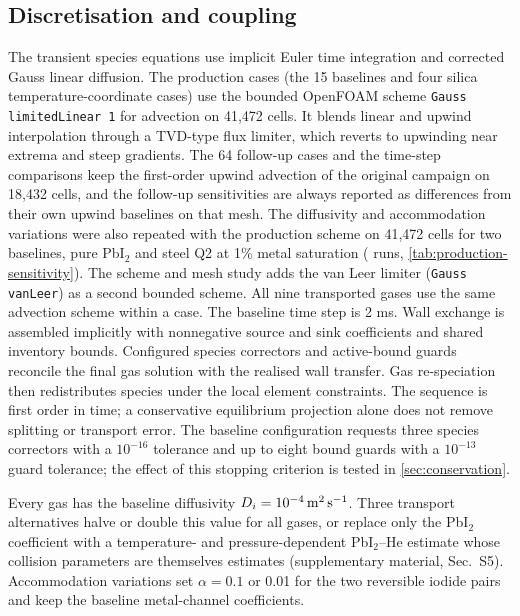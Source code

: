 \subsection{Discretisation and coupling}
The transient species equations use implicit Euler time integration
and corrected Gauss linear diffusion. The production cases (the 15
baselines and four silica temperature-coordinate cases) use the bounded
OpenFOAM scheme \texttt{Gauss limitedLinear 1}
\cite{Jasak1996error,Sweby1984high} for advection on 41,472 cells. It
blends linear and upwind interpolation through a TVD-type flux limiter,
which reverts to upwinding near extrema and steep gradients. The 64
follow-up cases and the time-step comparisons keep the first-order
upwind advection of the original campaign on 18,432 cells, and the
follow-up sensitivities are always reported as differences from their
own upwind baselines on that mesh. The diffusivity and accommodation
variations were also repeated with the production scheme on 41,472
cells for two baselines, pure PbI$_2$ and steel Q2 at 1\% metal
saturation (\PSRuns{} runs, \cref{tab:production-sensitivity}).
The scheme and mesh study adds the van Leer limiter
\cite{vanLeer1974towards} (\texttt{Gauss vanLeer}) as a second bounded
scheme. All nine transported gases use the same advection scheme
within a case. The baseline time
step is 2 ms. Wall exchange is assembled implicitly with nonnegative
source and sink coefficients and shared inventory bounds. Configured
species correctors and active-bound guards reconcile the final gas
solution with the realised wall transfer. Gas re-speciation then
redistributes species under the local element constraints. The
sequence is first order in time; a conservative equilibrium projection
alone does not remove splitting or transport error. The baseline
configuration requests three species correctors with a $10^{-16}$
tolerance and up to eight bound guards with a $10^{-13}$ guard
tolerance; the effect of this stopping criterion is tested in
\cref{sec:conservation}.

Every gas has the baseline diffusivity $D_i=10^{-4}\,\mathrm{m^2\,s^{-1}}$.
Three transport alternatives halve or double this value for all gases,
or replace only the PbI$_2$ coefficient with a temperature- and
pressure-dependent PbI$_2$--He estimate whose collision parameters are
themselves estimates (supplementary material, Sec.~S5). Accommodation
variations set $\alpha=0.1$ or 0.01 for the two reversible iodide pairs
and keep the baseline metal-channel coefficients.

